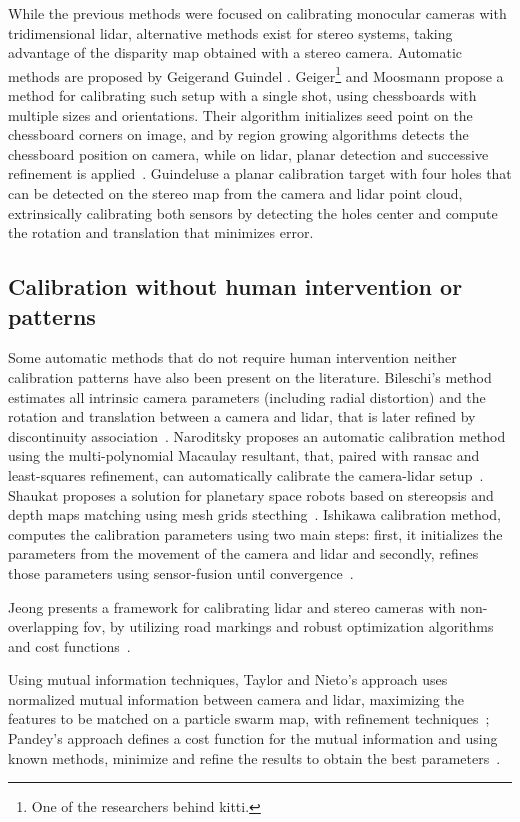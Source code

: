 While the previous methods were focused on calibrating monocular cameras with tridimensional \ac{lidar}, alternative methods exist for stereo systems, taking advantage of the disparity map obtained with a stereo camera. Automatic methods are proposed by Geiger\etal and Guindel \etal. Geiger\footnote{One of the researchers behind \ac{kitti}.} and Moosmann propose a method for calibrating such setup with a single shot, using chessboards with multiple sizes and orientations. Their algorithm initializes seed point on the chessboard corners on image, and by region growing algorithms detects the chessboard position on camera, while on \ac{lidar}, planar detection and successive refinement is applied~\cite{Geiger2012a}. Guindel\etal use a planar calibration target with four holes that can be detected on the stereo map from the camera and \ac{lidar} point cloud, extrinsically calibrating both sensors by detecting the holes center and compute the rotation and translation that minimizes error. 

\subsection{Calibration without human intervention or patterns}
Some automatic methods that do not require human intervention neither calibration patterns have also been present on the literature. Bileschi's method estimates all intrinsic camera parameters  (including radial distortion) and the rotation and translation between a camera and \ac{lidar}, that is later refined by discontinuity association~\cite{Bileschi2009}. Naroditsky \etal proposes an automatic calibration method using the multi-polynomial Macaulay resultant, that, paired with \ac{ransac} and least-squares refinement, can automatically calibrate the camera-\ac{lidar} setup~\cite{Naroditsky2011}. Shaukat proposes a solution for planetary space robots based on  stereopsis and depth maps matching using mesh grids stecthing~\cite{Shaukat2016}. Ishikawa \etal calibration method, computes the calibration parameters using two main steps: first, it initializes the parameters from the movement of the camera and \ac{lidar} and secondly, refines those parameters using sensor-fusion until convergence~\cite{Ishikawa2018}. 

Jeong \etal presents a framework for calibrating \ac{lidar} and stereo cameras with non-overlapping \ac{fov}, by utilizing road markings and robust optimization algorithms and cost functions~\cite{Jeong2019}.

Using mutual information techniques, Taylor and Nieto's approach uses normalized mutual information between camera and \ac{lidar}, maximizing the features to be matched on a particle swarm map, with refinement techniques~\cite{Taylor2013}; Pandey's \etal approach defines a cost function for the mutual information and using known methods, minimize and refine the results to obtain the best parameters~\cite{Pandey2012}.



